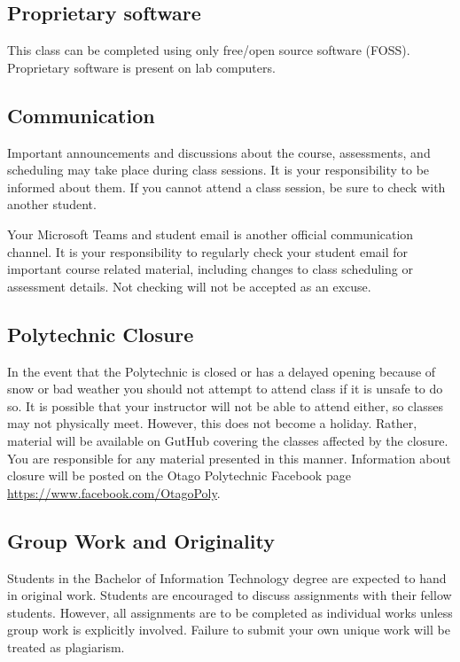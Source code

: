 \documentclass{article}
\begin{document}
\subsection*{Proprietary software}
This class can be completed using only free/open source software (FOSS). Proprietary software is present on lab computers. 


\subsection*{Communication}
Important announcements and discussions about the course, assessments, and scheduling may take place during class sessions.  It is your responsibility to be informed about them.  If you cannot attend a class session, be sure to check with another student.

Your Microsoft Teams and student email is another official communication channel. It is your responsibility to regularly check your student email for important course related material, including changes to class scheduling or assessment details. Not checking will not be accepted as an excuse.



\subsection*{Polytechnic Closure}
In the event that the Polytechnic is closed or has a delayed opening because of snow or bad weather you should not attempt to attend class if it is unsafe to do so. It is possible that your instructor will not be able to attend either, so classes may not physically meet. However, this does not become a holiday. Rather, material will be available on GutHub covering the classes affected by the closure. You are responsible for any material presented in this manner. Information about closure will be posted on the Otago Polytechnic Facebook page \url{https://www.facebook.com/OtagoPoly}.

\subsection*{Group Work and Originality}
Students in the Bachelor of Information Technology degree are expected to hand in original work.  
Students are encouraged to discuss assignments with their fellow students.  However, all assignments 
are to be completed as individual works unless group work is explicitly involved.
Failure to submit your own unique work will be treated as plagiarism.
\end{document}
